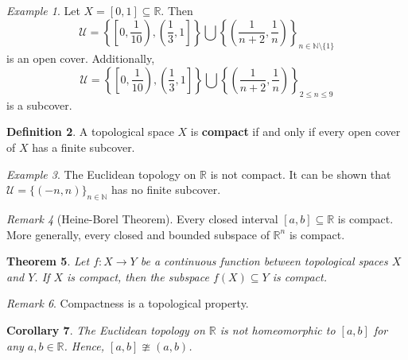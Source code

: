 \documentclass[ 12pt ]{article}
\newcounter{lecture_num}
\theoremstyle{plain}
\theoremstyle{plain}
\newtheorem{theorem}{Theorem}[lecture_num]
\newtheorem{corollary}[theorem]{Corollary}
\theoremstyle{definition}
\newtheorem{definition}[theorem]{Definition}
\theoremstyle{remark}
\newtheorem{remark}[theorem]{Remark}
\newtheorem{example}[theorem]{Example}
\begin{document}
\begin{example}
	Let $X = [0, 1] \subseteq \mathbb{R}$. Then $$\mathcal{U} = \left \{ \left [ 0, \frac{1}{10} \right ), \left ( \frac{1}{3}, 1 \right ] \right \} \bigcup \left \{ \left ( \frac{1}{n+2},
	\frac{1}{n} \right ) \right \}_{n \in \mathbb{N} \setminus \{ 1 \}}$$ is an open cover. Additionally, $$\mathcal{U} = \left \{ \left [ 0, \frac{1}{10} \right ), \left ( \frac{1}{3}, 1
	\right ] \right \} \bigcup \left \{ \left ( \frac{1}{n+2}, \frac{1}{n} \right ) \right \}_{2 \leq n \leq 9}$$ is a subcover.
\end{example}

\begin{definition}
	A topological space $X$ is \textbf{compact} if and only if every open cover of $X$ has a finite subcover.
\end{definition}

\begin{example}
	The Euclidean topology on $\mathbb{R}$ is not compact. It can be shown that $\mathcal{U} = \{ (-n, n) \}_{n \in \mathbb{N}}$ has no finite subcover.
\end{example}

\begin{remark}[Heine-Borel Theorem]
	Every closed interval $[a, b] \subseteq \mathbb{R}$ is compact. More generally, every closed and bounded subspace of $\mathbb{R}^n$ is compact.
\end{remark}

\begin{theorem}
	Let $f : X \to Y$ be a continuous function between topological spaces $X$ and $Y$. If $X$ is compact, then the subspace $f(X) \subseteq Y$ is compact.
\end{theorem}

\begin{remark}
	Compactness is a topological property.
\end{remark}

\begin{corollary}
	The Euclidean topology on $\mathbb{R}$ is not homeomorphic to $[a, b]$ for any $a, b \in \mathbb{R}$. Hence, $[a, b] \ncong (a, b)$.
\end{corollary}
\end{document}
